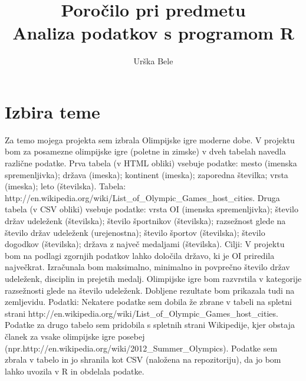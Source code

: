 \documentclass[11pt,a4paper]{article}
\begin{document}
\title{Poročilo pri predmetu \\
Analiza podatkov s programom R}
\author{Urška Bele}
\maketitle

\section{Izbira teme}
Za temo mojega projekta sem izbrala Olimpijske igre moderne dobe.
V projektu bom za posamezne olimpijske igre (poletne in zimske) v dveh tabelah navedla različne podatke.
Prva tabela (v HTML obliki) vsebuje podatke: mesto (imenska spremenljivka); država (imeska); kontinent (imeska); 
zaporedna številka; vrsta (imeska); leto (številska). Tabela: http://en.wikipedia.org/wiki/List_of_Olympic_Games_host_cities.
Druga tabela (v CSV obliki) vsebuje podatke: vrsta OI (imenska spremenljivka); število držav udeleženk (številska); 
število športnikov (številska); razsežnost glede na število držav udeleženk (urejenostna); število športov (številska); 
število dogodkov (številska); država z največ medaljami (številska).
Cilji: V projektu bom na podlagi zgornjih podatkov lahko določila državo, ki je OI priredila največkrat. 
Izračunala bom maksimalno, minimalno in povprečno število držav udeleženk, disciplin in prejetih medalj. 
Olimpijske igre bom razvrstila v kategorije razsežnosti glede na število udeleženk. Dobljene rezultate bom prikazala tudi 
na zemljevidu.
Podatki: Nekatere podatke sem dobila že zbrane v tabeli na spletni strani 
http://en.wikipedia.org/wiki/List_of_Olympic_Games_host_cities. Podatke za drugo tabelo sem pridobila s spletnih strani
 Wikipedije, kjer obstaja članek za vsake olimpijske igre posebej 
 (npr.http://en.wikipedia.org/wiki/2012_Summer_Olympics). 
 Podatke sem zbrala v tabelo in jo shranila kot CSV (naložena na repozitoriju), da jo bom lahko uvozila v R 
 in obdelala podatke.
\end{document}
